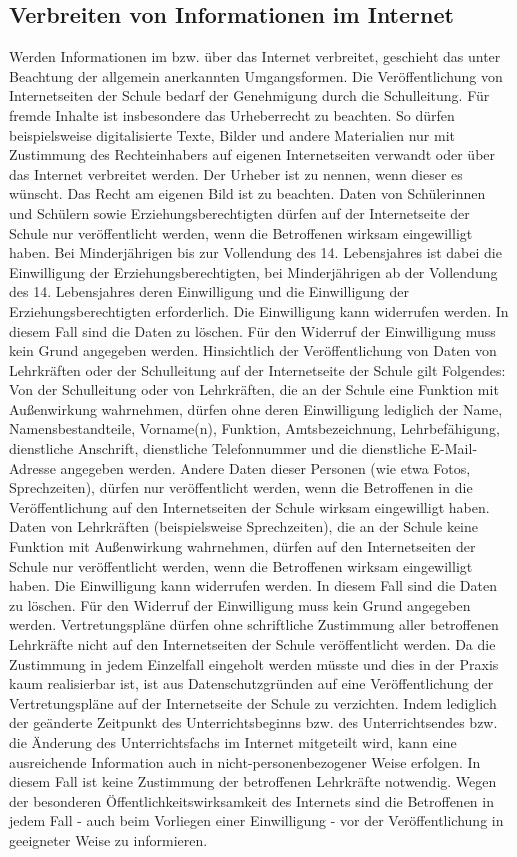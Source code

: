 \documentclass[a4paper, parskip]{scrartcl}
\begin{document}
\subsection{Verbreiten von Informationen im Internet}
Werden Informationen im bzw. über das Internet verbreitet, geschieht das unter
Beachtung der allgemein anerkannten Umgangsformen. Die Veröffentlichung von
Internetseiten der Schule bedarf der Genehmigung durch die Schulleitung. Für
fremde Inhalte ist insbesondere das Urheberrecht zu beachten. So dürfen
beispielsweise digitalisierte Texte, Bilder und andere Materialien nur mit
Zustimmung des Rechteinhabers auf eigenen Internetseiten verwandt oder über das
Internet verbreitet werden. Der Urheber ist zu nennen, wenn dieser es
wünscht. Das Recht am eigenen Bild ist zu beachten.
Daten von Schülerinnen und Schülern sowie Erziehungsberechtigten dürfen auf der
Internetseite der Schule nur veröffentlicht werden, wenn die Betroffenen
wirksam eingewilligt haben. Bei Minderjährigen bis zur Vollendung des 14.
Lebensjahres ist dabei die Einwilligung der Erziehungsberechtigten, bei
Minderjährigen ab der Vollendung des 14. Lebensjahres deren Einwilligung und
die Einwilligung der Erziehungsberechtigten erforderlich. Die Einwilligung kann
widerrufen werden. In diesem Fall sind die Daten zu löschen. Für den Widerruf
der Einwilligung muss kein Grund angegeben werden.
Hinsichtlich der Veröffentlichung von Daten von Lehrkräften oder der
Schulleitung auf der Internetseite der Schule gilt Folgendes:
Von der Schulleitung oder von Lehrkräften, die an der Schule eine Funktion mit
Außenwirkung wahrnehmen, dürfen ohne deren Einwilligung lediglich der Name,
Namensbestandteile, Vorname(n), Funktion, Amtsbezeichnung, Lehrbefähigung,
dienstliche Anschrift, dienstliche Telefonnummer und die dienstliche
E-Mail-Adresse angegeben werden. Andere Daten dieser Personen (wie etwa Fotos,
Sprechzeiten), dürfen nur veröffentlicht werden, wenn die Betroffenen in die
Veröffentlichung auf den Internetseiten der Schule wirksam eingewilligt
haben.
Daten von Lehrkräften (beispielsweise Sprechzeiten), die an der Schule keine
Funktion mit Außenwirkung wahrnehmen, dürfen auf den Internetseiten der
Schule nur veröffentlicht werden, wenn die Betroffenen wirksam eingewilligt
haben. Die Einwilligung kann widerrufen werden. In diesem Fall sind die Daten
zu löschen. Für den Widerruf der Einwilligung muss kein Grund angegeben werden.
Vertretungspläne dürfen ohne schriftliche Zustimmung aller betroffenen
Lehrkräfte nicht auf den Internetseiten der Schule veröffentlicht werden. Da
die Zustimmung in jedem Einzelfall eingeholt werden müsste und dies in der
Praxis kaum realisierbar ist, ist aus Datenschutzgründen auf eine
Veröffentlichung der Vertretungspläne auf der Internetseite der Schule zu verzichten.
Indem lediglich der geänderte Zeitpunkt des Unterrichtsbeginns bzw. des
Unterrichtsendes bzw. die Änderung des Unterrichtsfachs im Internet mitgeteilt
wird, kann eine ausreichende Information auch in nicht-personenbezogener Weise
erfolgen. In diesem Fall ist keine Zustimmung der betroffenen Lehrkräfte
notwendig.
Wegen der besonderen Öffentlichkeitswirksamkeit des Internets sind die
Betroffenen in jedem Fall - auch beim Vorliegen einer Einwilligung - vor der
Veröffentlichung in geeigneter Weise zu informieren.
\end{document}

